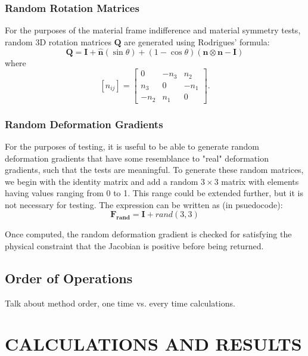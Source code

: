\documentclass[]{spie}  %
\begin{document}
\subsubsection{Random Rotation Matrices}
For the purposes of the material frame indifference and material symmetry tests, random 3D rotation matrices $\bm{Q}$ are generated using Rodrigues' formula:
\begin{equation}
\label{eq: random rotation}
	\bm{Q} = \bm{I} + \bm{\hat{n}}(\sin\theta)  + (1 - \cos\theta)(\bm{n} \otimes \bm{n} - \bm{I})
\end{equation}
where
\begin{equation}
	\left[\hat{n}_{ij}\right] = 
	\begin{bmatrix}
		0		&	-n_3	&	n_2 \\
		n_3		&	0		&	-n_1 \\
		-n_2	& 	n_1		& 0
	\end{bmatrix} .
\end{equation}

\subsubsection{Random Deformation Gradients}
For the purposes of testing, it is useful to be able to generate random deformation gradients that have some resemblance to "real" deformation gradients, such that the tests are meaningful. To generate these random matrices, we begin with the identity matrix and add a random $3 \times 3$ matrix with elements having values ranging from 0 to 1. This range could be extended further, but it is not necessary for testing. The expression can be written as (in psuedocode):
\begin{equation}
\label{eq: random deformation gradient}
	\bm{F_{rand}} = \bm{I} + rand(3,3)
\end{equation}

Once computed, the random deformation gradient is checked for satisfying the physical constraint that the Jacobian is positive before being returned. 

\subsection{Order of Operations}
Talk about method order, one time vs. every time calculations. 

	
\section{CALCULATIONS AND RESULTS} 
\end{document}

